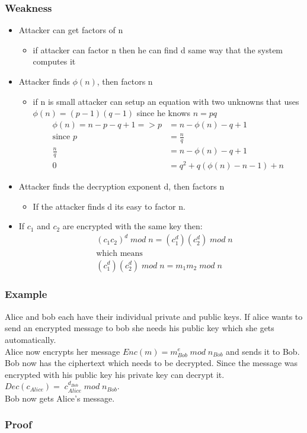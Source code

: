 \subsubsection{Weakness}
\begin{itemize}
\item Attacker can get factors of n
\begin{itemize}
\item if attacker can factor n then he can find d same way that the system computes it
\end{itemize}
\item Attacker finds $\phi (n)$, then factors n
\begin{itemize}
\item if n is small attacker can setup an equation with two unknowns that uses $\phi (n)=(p-1)(q-1)$ since he knows $n=pq$
\begin{align*}
\phi (n)=n-p-q+1=>p&=n-\phi (n)-q+1\\
\mbox{since } p&=\frac{n}{q}\\
\frac{n}{q}&=n-\phi (n)-q+1\\
0&=q^2+q(\phi (n)-n-1)+n
\end{align*}
\end{itemize}
\item Attacker finds the decryption exponent d, then factors n
\begin{itemize}
\item If the attacker finds d its easy to factor n.
\end{itemize}
\item If $c_1$ and $c_2$ are encrypted with the same key then:
\begin{align*}
&(c_1c_2)^d\; mod\; n = (c_1^d) (c_2^d)\; mod \;n\\
&\mbox{which means}\\
&(c_1^d) (c_2^d)\; mod \;n = m_1m_2\;mod \; n
\end{align*}



\end{itemize}
\subsubsection{Example}
Alice and bob each have their individual private and public keys.
If alice wants to send an encrypted message to bob she needs his public key which she gets automatically.\\
Alice now encrypts her message $Enc(m)=m^e_{Bob}\;mod\;n_{Bob}$ and sends it to Bob. \\
Bob now has the ciphertext which needs to be decrypted. Since the message was encrypted with his public key his private key can decrypt it. $Dec(c_{Alice})=\;c^{d_{Bob}}_{Alice}\;mod\;n_{Bob}$.\\
Bob now gets Alice’s message.

\subsubsection{Proof}
